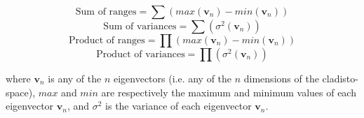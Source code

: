 \begin{equation}
    \text{Sum of ranges}=\sum{(max(\mathbf{v}_{n})-min(\mathbf{v}_{n}))}
\end{equation}
\begin{equation}
    \text{Sum of variances}=\sum{(\sigma^{2}(\mathbf{v}_{n}))}
\end{equation}
\begin{equation}
    \text{Product of ranges}=\prod{(max(\mathbf{v}_{n})-min(\mathbf{v}_{n}))}
\end{equation}
\begin{equation}
    \text{Product of variances}=\prod{(\sigma^{2}(\mathbf{v}_{n}))}
\end{equation}

\noindent
where $\mathbf{v}_{n}$ is any of the $n$ eigenvectors (i.e. any of the $n$ dimensions of the cladisto-space), $max$ and $min$ are respectively the maximum and minimum values of each eigenvector $\mathbf{v}_{n}$, and $\sigma^{2}$ is the variance of each eigenvector $\mathbf{v}_{n}$. 

